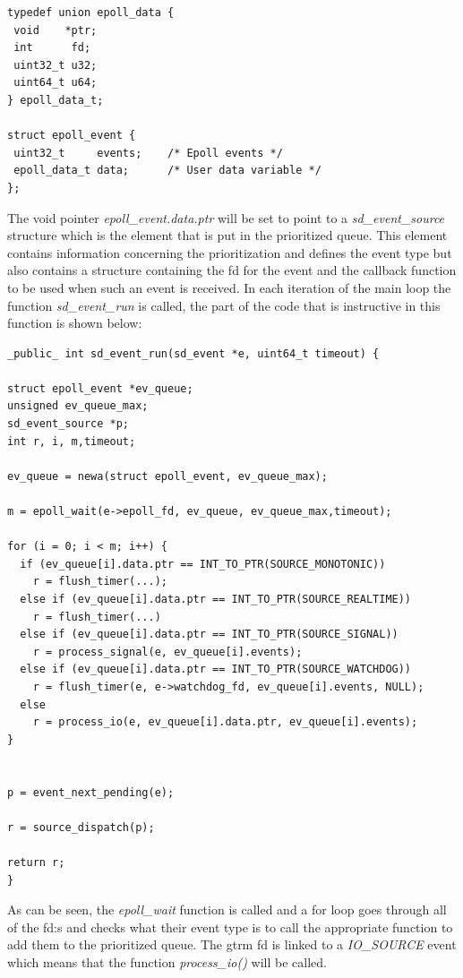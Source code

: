 \documentclass[nobiblatex]{LTHthesis}
\begin{document}
\begin{verbatim}
typedef union epoll_data {
 void    *ptr;
 int      fd;
 uint32_t u32;
 uint64_t u64;
} epoll_data_t;

struct epoll_event {
 uint32_t     events;    /* Epoll events */
 epoll_data_t data;      /* User data variable */
};
\end{verbatim}

The void pointer \emph{epoll\_event.data.ptr} will be set to point to a \emph{sd\_event\_source} structure which is the element that is put in the prioritized queue. This element contains information concerning the prioritization and  defines the event type but also contains a structure containing the fd for the event and the callback function to be used when such an event is received.
In each iteration of the main loop the function \emph{sd\_event\_run} is called, the part of the code that is instructive in this function is shown below:

\begin{verbatim}
_public_ int sd_event_run(sd_event *e, uint64_t timeout) {

struct epoll_event *ev_queue;
unsigned ev_queue_max;
sd_event_source *p;
int r, i, m,timeout;
            
ev_queue = newa(struct epoll_event, ev_queue_max);

m = epoll_wait(e->epoll_fd, ev_queue, ev_queue_max,timeout);

for (i = 0; i < m; i++) {
  if (ev_queue[i].data.ptr == INT_TO_PTR(SOURCE_MONOTONIC))
    r = flush_timer(...);
  else if (ev_queue[i].data.ptr == INT_TO_PTR(SOURCE_REALTIME))
    r = flush_timer(...)
  else if (ev_queue[i].data.ptr == INT_TO_PTR(SOURCE_SIGNAL))
    r = process_signal(e, ev_queue[i].events);
  else if (ev_queue[i].data.ptr == INT_TO_PTR(SOURCE_WATCHDOG))
    r = flush_timer(e, e->watchdog_fd, ev_queue[i].events, NULL);
  else
    r = process_io(e, ev_queue[i].data.ptr, ev_queue[i].events);
}


p = event_next_pending(e);

r = source_dispatch(p);

return r;
}
\end{verbatim}

As can be seen, the \emph{epoll\_wait} function is called and a for loop goes through all of the fd:s and checks what their event type is to call the appropriate function to add them to the prioritized queue.
The gtrm fd is linked to a \emph{IO\_SOURCE} event which means that the function \emph{process\_io()} will be called.
\end{document}
